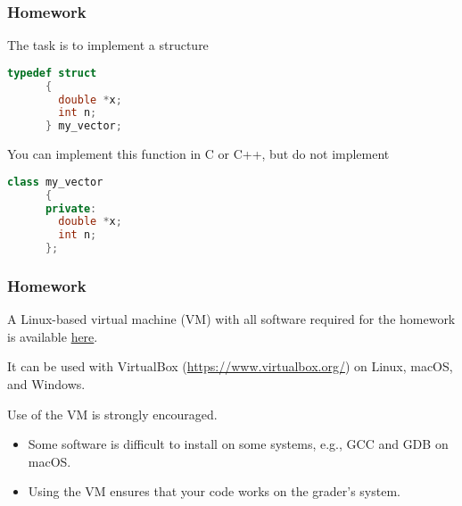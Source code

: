 \documentclass[12pt,t]{beamer}
\let\emph\relax %
\begin{document}
  \begin{frame}[fragile]
    \frametitle{Homework}

    \emph{Example 2:} The task is to implement a structure
    \begin{lstlisting}[language=c]
      typedef struct
      {
        double *x;
        int n;
      } my_vector;
    \end{lstlisting}

    You can implement this function in C or C++, but do not implement
    \begin{lstlisting}[language=c++]
      class my_vector
      {
      private:
        double *x;
        int n;
      };
    \end{lstlisting}
  \end{frame}

  \begin{frame}
    \frametitle{Homework}

    A Linux-based virtual machine (VM) with all software required for the homework is available \href{https://rice.box.com/s/1fsjlvmved24ffkwujcw5m450eovpyqq}{here}.

    It can be used with VirtualBox (\href{https://www.virtualbox.org/}{https://www.virtualbox.org/}) on Linux, macOS, and Windows.

    Use of the VM is strongly encouraged.
    \begin{itemize}
      \item Some software is difficult to install on some systems, e.g., GCC and GDB on macOS.
      \item Using the VM ensures that your code works on the grader's system.
    \end{itemize}
  \end{frame}
\end{document}
